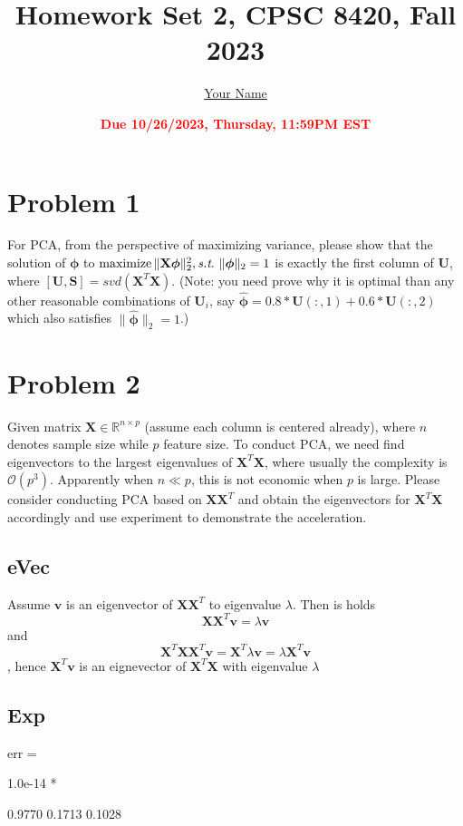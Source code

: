 \documentclass[11pt]{article}
\title{{\bf Homework Set 2, CPSC 8420, Fall 2023}} %
\author{\Large\underline{Your Name}}
\date{\textbf{\Large\textcolor{red}{Due 10/26/2023, Thursday, 11:59PM EST}}} %
\newcommand{\mfile}[1]  {{\small }} %
\newcommand{\R}{\mathbb{R}}
\newcommand{\maximize}{\operatorname*{maximize}}
\newcommand{\mtx}[1]{\mathbf{#1}}
\newcommand{\vct}[1]{\mathbf{#1}}
\def \mU {\mtx{U}}
\def \mS {\mtx{S}}
\def \mX {\mtx{X}}
\def \vv {\vct{v}}
\def \R {\mathbb{R}}
\begin{document}
	\maketitle
	

	\section{Problem 1}
	For PCA, from the perspective of maximizing variance, please show that the solution of $\bm{\phi}$ to $\maximize \|\mX \bm{\phi}\|^2_2, \st \ \|\bm{\phi}\|_2=1$ is exactly the first column of $\mU$, where $[\mU,\mS]=svd(\mX^T\mX)$. (Note: you need prove why it is optimal than any other reasonable combinations of $\mU_i$, say $\hat{\bm{\phi}}=0.8*\mU(:,1)+0.6*\mU(:,2)$ which also  satisfies $\|\hat{\bm{\phi}}\|_2=1$.)
	


	
	\vspace{4cm}
	\section{Problem 2}
	Given matrix $\mX\in\R^{n\times p}$ (assume each column is centered already), where $n$ denotes sample size while $p$ feature size. To conduct PCA, we need find eigenvectors to the  largest eigenvalues of $\mX^T\mX$, where usually the complexity is $\mathcal{O}(p^3)$. Apparently when $n\ll p$, this is not economic when $p$ is large. Please consider conducting PCA based on $\mX\mX^T$ and obtain the eigenvectors for $\mX^T\mX$ accordingly and use experiment to demonstrate the acceleration.
	\vspace{0.5cm}
	
	\subsection{eVec}
	Assume $\vv$ is an eigenvector of $\mX\mX^T$ to eigenvalue $\lambda$. Then is holds $$\mX\mX^T\vv=\lambda\vv$$ and 
	$$\mX^T\mX\mX^T\vv=\mX^T\lambda\vv =\lambda\mX^T\vv$$, hence $\mX^T\vv$ is an eignevector of $\mX^T\mX$  with eigenvalue $\lambda$

	\subsection{Exp}
	\mfile{q2.m}
	err =

   1.0e-14 *

    0.9770    0.1713    0.1028

	
\end{document}
